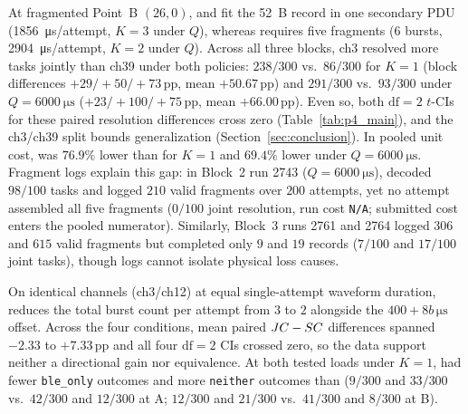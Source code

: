 At fragmented Point~B $(26,0)$, \modejc{} and \modesc{} fit the \SI{52}{B} \ble{} record in one secondary PDU (\SI{1856}{\micro\second}/attempt, $K{=}3$ under $Q$), whereas \modelc{} requires five \fragproto{} fragments ($6$ bursts, \SI{2904}{\micro\second}/attempt, $K{=}2$ under $Q$). Across all three blocks, ch3 \modejc{} resolved more tasks jointly than ch39 \modelc{} under both policies: $238/300$ vs.\ $86/300$ for $K{=}1$ (block differences $+29/{+}50/{+}73$\,pp, mean $+50.67$\,pp) and $291/300$ vs.\ $93/300$ under $Q{=}\SI{6000}{\micro\second}$ ($+23/{+}100/{+}75$\,pp, mean $+66.00$\,pp). Even so, both $\text{df}{=}2$ $t$-CIs for these paired resolution differences cross zero (Table~\ref{tab:p4_main}), and the ch3/ch39 split bounds generalization (Section~\ref{sec:conclusion}). In pooled unit cost, \modejc{} was $76.9\%$ lower than \modelc{} for $K{=}1$ and $69.4\%$ lower under $Q{=}\SI{6000}{\micro\second}$. Fragment logs explain this gap: in Block~2 run 2743 ($Q{=}\SI{6000}{\micro\second}$), \stdfour{} decoded $98/100$ tasks and \ble{} logged $210$ valid fragments over $200$ attempts, yet no attempt assembled all five fragments ($0/100$ joint resolution, run cost \texttt{N/A}; submitted cost enters the pooled numerator). Similarly, Block~3 runs 2761 and 2764 logged $306$ and $615$ valid fragments but completed only $9$ and $19$ records ($7/100$ and $17/100$ joint tasks), though logs cannot isolate physical loss causes.

On identical channels (ch3/ch12) at equal single-attempt waveform duration, \modejc{} reduces the total burst count per attempt from $3$ to $2$ alongside the $400{+}8b\,\si{\micro\second}$ offset. Across the four conditions, mean paired $JC{}-SC{}$ differences spanned $-2.33$ to $+7.33$\,pp and all four $\text{df}{=}2$ CIs crossed zero, so the data support neither a directional gain nor equivalence. At both tested loads under $K{=}1$, \modejc{} had fewer \texttt{ble\_only} outcomes and more \texttt{neither} outcomes than \modesc{} ($9/300$ and $33/300$ vs.\ $42/300$ and $12/300$ at A; $12/300$ and $21/300$ vs.\ $41/300$ and $8/300$ at B).

